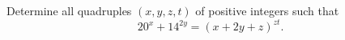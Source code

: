 Determine all quadruples $(x,y,z,t)$ of positive integers such that\[ 20^x + 14^{2y} = (x + 2y + z)^{zt}.\]